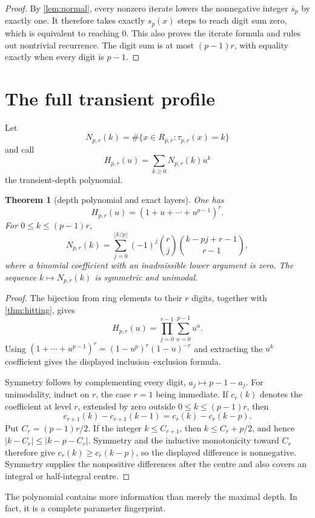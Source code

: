\documentclass[11pt,a4paper]{amsart}
\newtheorem{theorem}{Theorem}[section]
\theoremstyle{definition}
\theoremstyle{remark}
\begin{document}
\begin{proof}
By \cref{lem:normal}, every nonzero iterate lowers the nonnegative integer
$s_p$ by exactly one.  It therefore takes exactly $s_p(x)$ steps to reach
digit sum zero, which is equivalent to reaching $0$.  This also proves the
iterate formula and rules out nontrivial recurrence.  The digit sum is at
most $(p-1)r$, with equality exactly when every digit is $p-1$.
\end{proof}

\section{The full transient profile}

Let
\[
 N_{p,r}(k)=\#\{x\in R_{p,r}:\tau_{p,r}(x)=k\}
\]
and call
\[
 H_{p,r}(u)=\sum_{k\geq0}N_{p,r}(k)u^k
\]
the transient-depth polynomial.

\begin{theorem}[depth polynomial and exact layers]\label{thm:profile}
One has
\[
 \boxed{H_{p,r}(u)=(1+u+\cdots+u^{p-1})^r.}
\]
For $0\leq k\leq(p-1)r$,
\[
 \boxed{
 N_{p,r}(k)=
 \sum_{j=0}^{\lfloor k/p\rfloor}
 (-1)^j\binom rj\binom{k-pj+r-1}{r-1},}
\]
where a binomial coefficient with an inadmissible lower argument is zero.
The sequence $k\mapsto N_{p,r}(k)$ is symmetric and unimodal.
\end{theorem}

\begin{proof}
The bijection from ring elements to their $r$ digits, together with
\cref{thm:hitting}, gives
\[
 H_{p,r}(u)=
 \prod_{j=0}^{r-1}\sum_{a=0}^{p-1}u^a.
\]
Using $(1+\cdots+u^{p-1})^r=(1-u^p)^r(1-u)^{-r}$ and extracting the
$u^k$ coefficient gives the displayed inclusion--exclusion formula.

Symmetry follows by complementing every digit, $a_j\mapsto p-1-a_j$.
For unimodality, induct on $r$, the case $r=1$ being immediate.  If $c_r(k)$ denotes the coefficient at
level $r$, extended by zero outside $0\leq k\leq(p-1)r$, then
\[
 c_{r+1}(k)-c_{r+1}(k-1)=c_r(k)-c_r(k-p).
\]
Put $C_r=(p-1)r/2$.  If the integer $k\leq C_{r+1}$, then
$k\leq C_r+p/2$, and hence
$|k-C_r|\leq|k-p-C_r|$.  Symmetry and the inductive monotonicity toward
$C_r$ therefore give $c_r(k)\geq c_r(k-p)$, so the displayed difference is
nonnegative.  Symmetry supplies the nonpositive differences after the
centre and also covers an integral or half-integral centre.
\end{proof}

The polynomial contains more information than merely the maximal depth.  In
fact, it is a complete parameter fingerprint.
\end{document}
